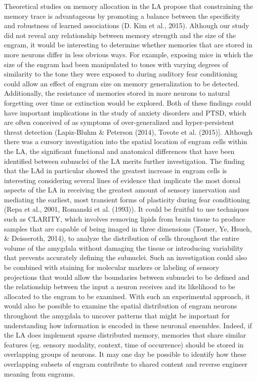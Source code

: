 \documentclass[12pt,a4paper,]{report}
\begin{document}
Theoretical studies on memory allocation in the LA propose that
constraining the memory trace is advantageous by promoting a balance
between the specificity and robustness of learned associations (D. Kim
et al., 2015). Although our study did not reveal any relationship
between memory strength and the size of the engram, it would be
interesting to determine whether memories that are stored in more
neurons differ in less obvious ways. For example, exposing mice in which
the size of the engram had been manipulated to tones with varying
degrees of similarity to the tone they were exposed to during auditory
fear conditioning could allow an effect of engram size on memory
generalization to be detected. Additionally, the resistance of memories
stored in more neurons to natural forgetting over time or extinction
would be explored. Both of these findings could have important
implications in the study of anxiety disorders and PTSD, which are often
conceived of as symptoms of over-generalized and hyper-persistent threat
detection (Lapiz-Bluhm \& Peterson (2014), Tovote et al. (2015){]}.
Although there was a cursory investigation into the spatial location of
engram cells within the LA, the significant functional and anatomical
differences that have been identified between subnuclei of the LA merits
further investigation. The finding that the LAd in particular showed the
greatest increase in engram cells is interesting considering several
lines of evidence that implicate the most dorsal aspects of the LA in
receiving the greatest amount of sensory innervation and mediating the
earliest, most transient forms of plasticity during fear conditioning
(Repa et al., 2001, Romanski et al. (1993)). It could be fruitful to use
techniques such as CLARITY, which involves removing lipids from brain
tissue to produce samples that are capable of being imaged in three
dimensions (Tomer, Ye, Hsueh, \& Deisseroth, 2014), to analyze the
distribution of cells throughout the entire volume of the amygdala
without damaging the tissue or introducing variability that prevents
accurately defining the subnuclei. Such an investigation could also be
combined with staining for molecular markers or labeling of sensory
projections that would allow the boundaries between subnuclei to be
defined and the relationship between the input a neuron receives and its
likelihood to be allocated to the engram to be examined. With such an
experimental approach, it would also be possible to examine the spatial
distribution of engram neurons throughout the amygdala to uncover
patterns that might be important for understanding how information is
encoded in these neuronal ensembles. Indeed, if the LA does implement
sparse distributed memory, memories that share similar features (eg.
sensory modality, context, time of occurrence) should be stored in
overlapping groups of neurons. It may one day be possible to identify
how these overlapping subsets of engram contribute to shared content and
reverse engineer meaning from engrams.
\end{document}
